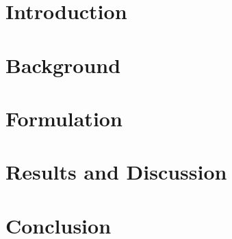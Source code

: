 
\section{Introduction}
\label{sec:introduction}


%

\section{Background}
\label{sec:background}


%

\section{Formulation}
\label{sec:formulation}


%

\clearpage

\section{Results and Discussion}
\label{sec:results}


%

\section{Conclusion}
\label{sec:conclusion}




